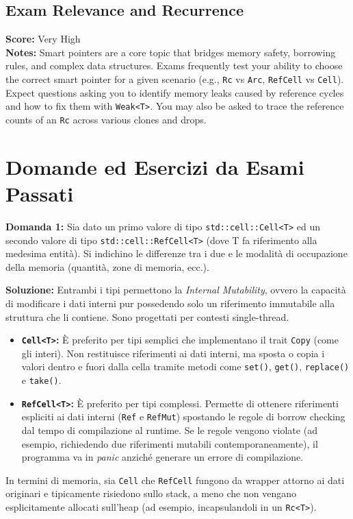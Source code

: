 \subsection*{Exam Relevance and Recurrence}
\textbf{Score:} Very High \\
\textbf{Notes:} Smart pointers are a core topic that bridges memory safety, borrowing rules, and complex data structures. Exams frequently test your ability to choose the correct smart pointer for a given scenario (e.g., \texttt{Rc} vs \texttt{Arc}, \texttt{RefCell} vs \texttt{Cell}). Expect questions asking you to identify memory leaks caused by reference cycles and how to fix them with \texttt{Weak<T>}. You may also be asked to trace the reference counts of an \texttt{Rc} across various clones and drops.

\section{Domande ed Esercizi da Esami Passati}

\begin{exambox}
\textbf{Domanda 1:} Sia dato un primo valore di tipo \texttt{std::cell::Cell<T>} ed un secondo valore di tipo \texttt{std::cell::RefCell<T>} (dove T fa riferimento alla medesima entità). Si indichino le differenze tra i due e le modalità di occupazione della memoria (quantità, zone di memoria, ecc.).
\end{exambox}
\textbf{Soluzione:}
Entrambi i tipi permettono la \textit{Internal Mutability}, ovvero la capacità di modificare i dati interni pur possedendo solo un riferimento immutabile alla struttura che li contiene. Sono progettati per contesti single-thread.
\begin{itemize}
    \item \textbf{\texttt{Cell<T>}:} È preferito per tipi semplici che implementano il trait \texttt{Copy} (come gli interi). Non restituisce riferimenti ai dati interni, ma sposta o copia i valori dentro e fuori dalla cella tramite metodi come \texttt{set()}, \texttt{get()}, \texttt{replace()} e \texttt{take()}.
    \item \textbf{\texttt{RefCell<T>}:} È preferito per tipi complessi. Permette di ottenere riferimenti espliciti ai dati interni (\texttt{Ref} e \texttt{RefMut}) spostando le regole di borrow checking dal tempo di compilazione al runtime. Se le regole vengono violate (ad esempio, richiedendo due riferimenti mutabili contemporaneamente), il programma va in \textit{panic} anziché generare un errore di compilazione.
\end{itemize}
In termini di memoria, sia \texttt{Cell} che \texttt{RefCell} fungono da wrapper attorno ai dati originari e tipicamente risiedono sullo stack, a meno che non vengano esplicitamente allocati sull'heap (ad esempio, incapsulandoli in un \texttt{Rc<T>}).

